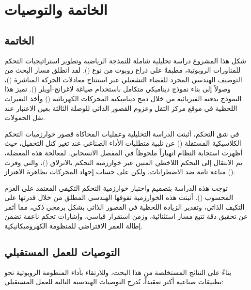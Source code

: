 \chapter{الخاتمة والتوصيات}

\section{الخاتمة }


شكل هذا المشروع دراسة تحليلية شاملة للنمذجة الرياضية وتطوير استراتيجيات التحكم للمناورات الروبوتية، مطبقةً على ذراع روبوت من نوع (). لقد انطلق مسار البحث من التوصيف الهندسي المجرد للفضاء التشغيلي عبر استنتاج معادلات الحركة المباشرة ()، وصولاً إلى بناء نموذج ديناميكي متكامل باستخدام صياغة لاغرانج-أويلر (). تميز هذا النموذج بدقته الفيزيائية من خلال دمج ديناميكية المحركات الكهربائية () وأخذ التغيرات اللحظية في موقع مركز الثقل وعزوم القصور الذاتي للوصلة الثالثة بعين الاعتبار عند نقل الحمولات.

في شق التحكم، أثبتت الدراسة التحليلية وعمليات المحاكاة قصور خوارزميات التحكم الكلاسيكية المستقلة () عن تلبية متطلبات الأداء الصناعي عند تغير كتل التحميل، حيث أظهرت استجابة النظام انهياراً ملحوظاً في المفصل الانسحابي. لمعالجة هذه المعضلة، تم الانتقال إلى التحكم اللاخطي المتين عبر خوارزمية التحكم بالانزلاق ()، والتي وفرت مناعة تامة ضد الاضطرابات، ولكن على حساب إجهاد المحركات بظاهرة الاهتزاز (). 

توجت هذه الدراسة بتصميم واختبار خوارزمية التحكم التكيفي المعتمد على العزم المحسوب (). أثبتت هذه الخوارزمية تفوقها الهندسي المطلق من خلال قدرتها على التكيف الذاتي، وتقدير الزيادة اللحظية في القصور الذاتي بشكل برمجي ذكي، مما أثمر عن تحقيق دقة تتبع مسار استثنائية، وزمن استقرار قياسي، وإشارات تحكم ناعمة تضمن إطالة العمر الافتراضي للمنظومة الكهروميكانيكية.

\section{التوصيات للعمل المستقبلي }

بناءً على النتائج المستخلصة من هذا البحث، وللارتقاء بأداء المنظومة الروبوتية نحو تطبيقات صناعية أكثر تعقيداً، نُدرج التوصيات الهندسية التالية للعمل المستقبلي:

